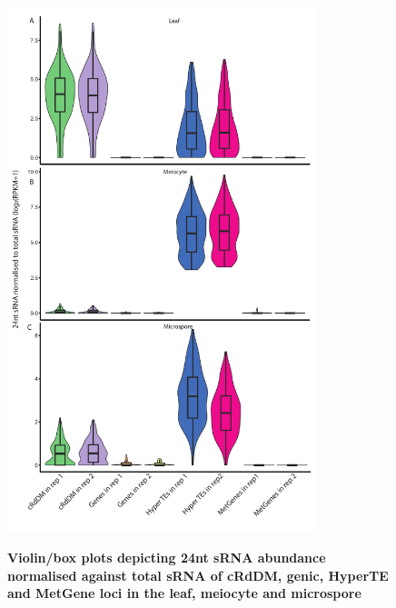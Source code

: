 \begin{figure}[htbp!] 
\centering    
    \includegraphics[width=0.8\textwidth]{Chapter2/Figs/Supps/FigureS8_boxplots_meiocyte_microspore.pdf}
\caption{\textbf{Violin/box plots depicting 24nt sRNA abundance normalised against total sRNA of cRdDM, genic, HyperTE and MetGene loci in the leaf, meiocyte and microspore}}
\label{fig:boxplot-MCMS}
\captionsetup{font=small}
    \caption*{}
\end{figure}

